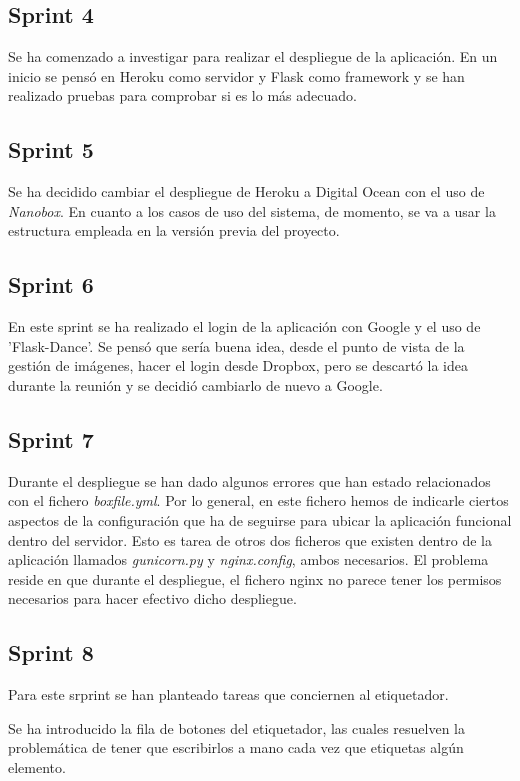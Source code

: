 \subsection{Sprint 4}
Se ha comenzado a investigar para realizar el despliegue de la aplicación. En un inicio se pensó en Heroku como servidor y Flask como framework y se han realizado pruebas para comprobar si es lo más adecuado. 

\subsection{Sprint 5}
Se ha decidido cambiar el despliegue de Heroku a Digital Ocean con el uso de \textit{Nanobox}. En cuanto a los casos de uso del sistema, de momento, se va a usar la estructura empleada en la versión previa del proyecto.

\subsection{Sprint 6}
En este sprint se ha realizado el login de la aplicación con Google y el uso de 'Flask-Dance'. Se pensó que sería buena idea, desde el punto de vista de la gestión de imágenes, hacer el login desde Dropbox, pero se descartó la idea durante la reunión y se decidió cambiarlo de nuevo a Google.


\subsection{Sprint 7}

Durante el despliegue se han dado algunos errores que han estado relacionados con el fichero \textit{boxfile.yml}. Por lo general, en este fichero hemos de indicarle ciertos aspectos de la configuración que ha de seguirse para ubicar la aplicación funcional dentro del servidor. Esto es tarea de otros dos ficheros que existen dentro de la aplicación llamados \textit{gunicorn.py} y \textit{nginx.config}, ambos necesarios. El problema reside en que durante el despliegue, el fichero nginx no parece tener los permisos necesarios para hacer efectivo dicho despliegue. 

\subsection{Sprint 8}

Para este srprint se han planteado tareas que conciernen al etiquetador. 

Se ha introducido la fila de botones del etiquetador, las cuales resuelven la problemática de tener que escribirlos a mano cada vez que etiquetas algún elemento.


